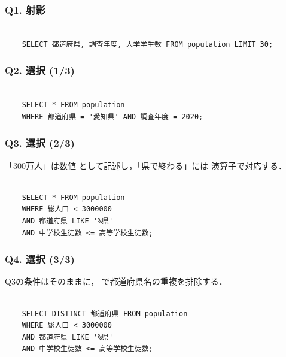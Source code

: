\subsubsection*{Q1. 射影}
\begin{verbatim}

    SELECT 都道府県, 調査年度, 大学学生数 FROM population LIMIT 30;

\end{verbatim}

\subsubsection*{Q2. 選択 (1/3)}
\begin{verbatim}

    SELECT * FROM population
    WHERE 都道府県 = '愛知県' AND 調査年度 = 2020;

\end{verbatim}

\subsubsection*{Q3. 選択 (2/3)}
「300万人」は数値  として記述し，「県で終わる」には  演算子で対応する．
\begin{verbatim}

    SELECT * FROM population
    WHERE 総人口 < 3000000
    AND 都道府県 LIKE '%県'
    AND 中学校生徒数 <= 高等学校生徒数;

\end{verbatim}

\subsubsection*{Q4. 選択 (3/3)}
Q3の条件はそのままに， で都道府県名の重複を排除する．
\begin{verbatim}

    SELECT DISTINCT 都道府県 FROM population
    WHERE 総人口 < 3000000
    AND 都道府県 LIKE '%県'
    AND 中学校生徒数 <= 高等学校生徒数;

\end{verbatim}

